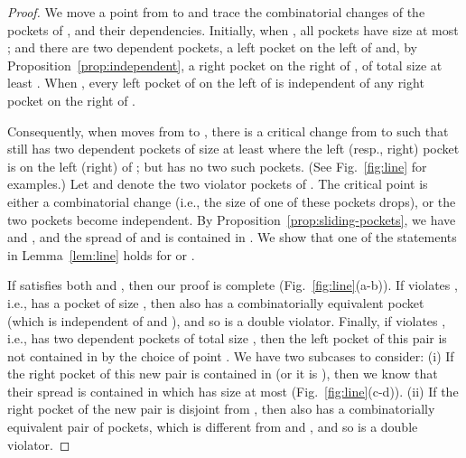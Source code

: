 \documentclass[12pt]{article}
\begin{document}
\begin{proof}
We move a point  from  to  and trace the combinatorial changes
of the pockets of , and their dependencies. Initially, when , all pockets
have size at most ; and there are two dependent pockets, a left pocket  on the left of  and, by Proposition~\ref{prop:independent}, a right pocket  on the right of , of total size at least . When , every left pocket of  on the left of  is independent of any right pocket on the right of .

Consequently, when  moves from  to , there is a critical change from  to  such that  still has two dependent pockets of size at least  where the left (resp., right) pocket is on the left (right) of ; but  has no two such pockets. (See Fig.~\ref{fig:line} for examples.) Let  and  denote the two violator pockets of . The critical point is either a combinatorial change (i.e., the size of one of these pockets drops), or the two pockets become independent. By Proposition~\ref{prop:sliding-pockets}, we have  and , and the spread of  and  is contained in . We show that one of the statements in Lemma~\ref{lem:line} holds for  or .

If  satisfies both  and , then our proof is complete (Fig.~\ref{fig:line}(a-b)).
If  violates , i.e.,  has a pocket of size ,
then  also has a combinatorially equivalent pocket (which is independent of  and ), and so  is a double violator. Finally, if  violates , i.e.,  has two dependent pockets of total size , then the left pocket of this pair is not contained in  by the choice of point . We have two subcases to consider: (i) If the right pocket of this new pair is contained in  (or it is ), then we know that their spread is contained in  which has size at most   (Fig.~\ref{fig:line}(c-d)). (ii) If the right pocket of the new pair is disjoint from , then  also has a combinatorially equivalent pair of pockets, which is different from  and , and so  is a double violator.
\end{proof}
\end{document}
